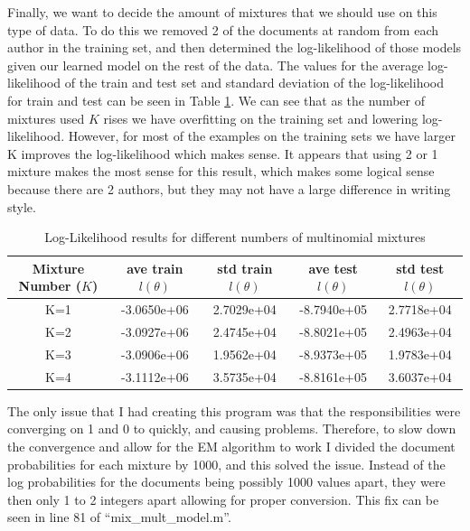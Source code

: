 \documentclass[paper=a4, fontsize=11pt]{scrartcl} %
\begin{document}
Finally, we want to decide the amount of mixtures that we should use on this type of data.
To do this we removed 2 of the documents at random from each author in the training set, and then determined the log-likelihood of those models given our learned model on the rest of the data.
The values for the average log-likelihood of the train and test set and standard deviation of the log-likelihood for train and test can be seen in Table \ref{tab:mm}.
We can see that as the number of mixtures used $K$ rises we have overfitting on the training set and lowering log-likelihood. 
 However, for most of the examples on the training sets we have larger K improves the log-likelihood which makes sense.
It appears that using 2 or 1 mixture makes the most sense for this result, which makes some logical sense because there are 2 authors, but they may not have a large difference in writing style.

\begin{table}
\centering
\label{tab:mm}
\caption{Log-Likelihood results for different numbers of multinomial mixtures}
\begin{tabular}{|c|c|c|c|c|}
\hline
Mixture Number ($K$) & ave train $l(\theta)$ & std train $l(\theta)$  & ave test $l(\theta)$  &  std test $l(\theta)$  \\ \hline \hline
K=1 & -3.0650e+06 & 2.7029e+04 &  -8.7940e+05 & 2.7718e+04 \\ \hline
K=2 &  -3.0927e+06 & 2.4745e+04 & -8.8021e+05 &  2.4963e+04 \\ \hline
K=3 & -3.0906e+06 & 1.9562e+04 & -8.9373e+05 & 1.9783e+04 \\ \hline
K=4 & -3.1112e+06 & 3.5735e+04 & -8.8161e+05 & 3.6037e+04 \\ \hline
\end{tabular}
\end{table}


The only issue that I had creating this program was that the responsibilities were converging on 1 and 0 to quickly, and causing problems.  
Therefore, to slow down the convergence and allow for the EM algorithm to work I divided the document probabilities for each mixture by 1000, and this solved the issue.  
Instead of the log probabilities for the documents being possibly 1000 values apart, they were then only 1 to 2 integers apart allowing for proper conversion.  
This fix can be seen in line 81 of ``mix\_mult\_model.m''.



\end{document}
